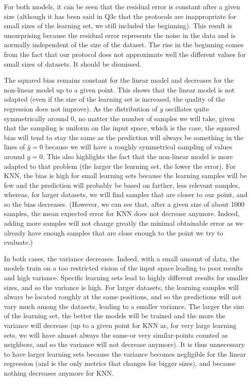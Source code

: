 For both models, it can be seen that the residual error is constant after a given size (although it has been said in Q3c that the protocols are inappropriate for small sizes of the learning set, we still included the beginning). This result is unsurprising because the residual error represents the noise in the data and is normally independent of the size of the dataset. The rise in the beginning comes from the fact that our protocol does not approximate well the different values for small sizes of datasets. It should be dismissed.\par
The squared bias remains constant for the linear model and decreases for the non-linear model up to a given point. This shows that the linear model is not adapted (even if the size of the learning set is increased, the quality of the regression does not improve). As the distribution of $y$ oscillates quite symmetrically around $0$, no matter the number of samples we will take, given that the sampling is uniform on the input space, which is the case, the squared bias will tend to stay the same as the prediction will always be something in the lines of $\hat{y} = 0$ because we will have a roughly symmetrical sampling of values around $y = 0$. This also highlights the fact that the non-linear model is more adapted to that problem (the larger the learning set, the lower the error).\newline
For KNN, the bias is high for small learning sets because the learning samples will be few and the prediction will probably be based on farther, less relevant samples, whereas, for larger datasets, we will find samples that are closer to our point, and so the bias decreases. (However, we can see that, after a given size of about 1000 samples, the mean expected error for KNN does not decrease anymore. Indeed, adding more samples will not change greatly the minimal obtainable error as we already have enough samples that are close enough to the point we try to evaluate.) \par
In both cases, the variance decreases. Indeed, with a small amount of data, the models train on a too restricted vision of the input space leading to poor results and high variance. Specific learning sets lead to highly different results for smaller sizes, and so the variance is high. For larger datasets, the learning samples will always be located roughly at the same positions, and so the predictions will not vary much among the datasets, leading to a smaller variance. The larger the size of the learning set, the better the models will be trained and the more the variance will decrease (up to a given point for KNN as, for very large learning sets, we will have almost always the same-or very similar-points counted as neighbors, and so the variance will not decrease anymore). It is thus unnecessary to have larger learning sets because the variance becomes negligible for the linear regression (and is the only metrics that changes for bigger sizes), and because nothing decreases anymore for KNN.\par

